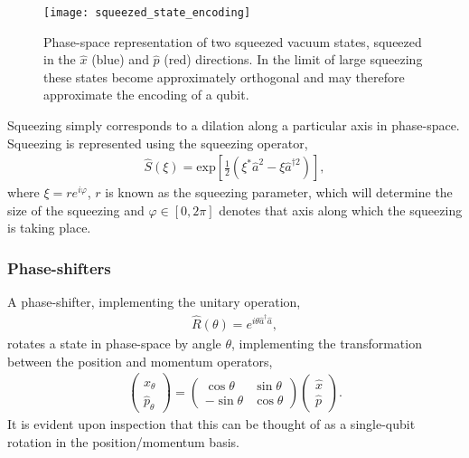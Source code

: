 \begin{figure}[htpb]
\texttt{[image: squeezed\_state\_encoding]}
\caption{Phase-space representation of two squeezed vacuum states, squeezed in the $\hat{x}$ (blue) and $\hat{p}$ (red) directions. In the limit of large squeezing these states become approximately orthogonal and may therefore approximate the encoding of a qubit.} \label{fig:squeezed_state_encoding}	
\end{figure}

Squeezing simply corresponds to a dilation along a particular axis in phase-space. Squeezing is represented using the squeezing operator,
\begin{align}\label{eq:sq_op}
\hat{S}(\xi) = \mathrm{exp}\left[ \frac{1}{2}(\xi^*\hat{a}^2 - \xi{\hat{a}^{\dag 2}})\right],
\end{align}
where \mbox{$\xi  = r e^{i \varphi}$}, $r$ is known as the squeezing parameter, which will determine the size of the squeezing and \mbox{$\varphi \in [0, 2\pi]$} denotes that axis along which the squeezing is taking place.


%
%

\subsubsection{Phase-shifters}

A phase-shifter, implementing the unitary operation,
\begin{align}
\hat{R}(\theta) = e^{i\theta \hat a^\dag \hat a},
\end{align}
rotates a state in phase-space by angle $\theta$, implementing the transformation between the position and momentum operators,
\begin{align}
\begin{pmatrix}
\hat x_{\theta}\\
\hat p_{\theta}
\end{pmatrix}
=
\begin{pmatrix}\cos\theta & \sin\theta \\
-\sin\theta & \cos\theta
\end{pmatrix}
\begin{pmatrix}
\hat x\\
\hat p
\end{pmatrix}.
\end{align}
It is evident upon inspection that this can be thought of as a single-qubit rotation in the position/momentum basis. 

